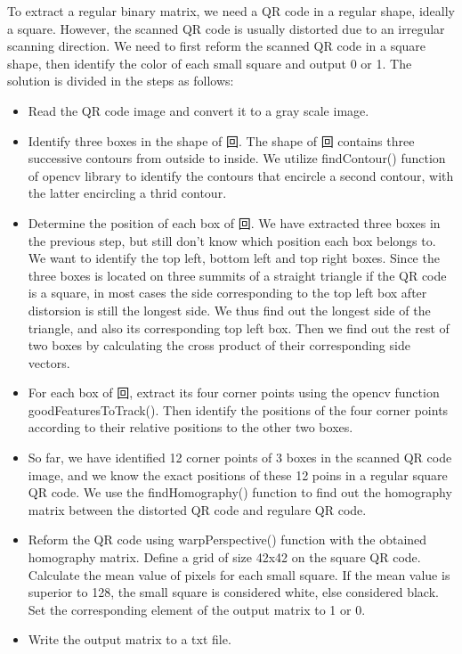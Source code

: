 \documentclass[10pt]{article}
\begin{document}
To extract a regular binary matrix, we need a QR code in a regular shape, ideally a square. However,
the scanned QR code is usually distorted due to an irregular scanning direction. We need to first 
reform the scanned QR code in a square shape, then identify the color of each small 
square and output 0 or 1. The solution is divided in the steps as follows: \\
\begin{itemize}

\item Read the QR code image and convert it to a gray scale image.

\item Identify three boxes in the shape of 回. The shape of 回 contains three successive contours
from outside to inside. We utilize findContour() function of opencv library to identify
the contours that encircle a second contour, with the latter encircling a thrid contour. 

\item Determine the position of each box of 回. We have extracted three boxes in the previous step, but
still don't know which position each box belongs to. We want to identify the top left, bottom left 
and top right boxes. Since the three boxes is located on three 
summits of a straight triangle if the QR code is a square, in most cases the side corresponding
to the top left box after distorsion is still the longest side. We thus find out the longest side
of the triangle, and also its corresponding top left box. Then we find out the rest of two boxes 
by calculating the cross product of their corresponding side vectors.

\item For each box of 回, extract its four corner points using the opencv function goodFeaturesToTrack().
Then identify the positions of the four corner points according to their relative positions 
to the other two boxes.

\item So far, we have identified 12 corner points of 3 boxes in the scanned QR code image, and we
 know the exact positions of these 12 poins in a regular square QR code. We use the findHomography()
 function to find out the homography matrix between the distorted QR code and regulare QR code.

\item Reform the QR code using warpPerspective() function with the obtained homography matrix. Define 
a grid of size 42x42 on the square QR code. Calculate the mean value of pixels for each small square.
If the mean value is superior to 128, the small square is considered white, else considered black.
Set the corresponding element of the output matrix to 1 or 0.

\item Write the output matrix to a txt file.


\end{itemize}
\end{document}
